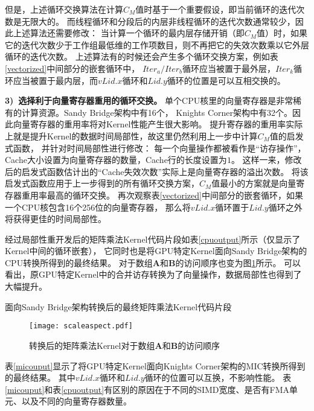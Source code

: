 但是，上述循环交换算法在计算$C_M$值时基于一个重要假设，即当前循环的迭代次数是无限大的。
而线程循环和分段后的内层非线程循环的迭代次数通常较少，因此上述算法还需要修改：
当计算一个循环的最内层存储开销（即$C_M$值）时，如果它的迭代次数少于工作组最低维的工作项数目，则不再把它的失效次数乘以它外层循环的迭代次数。
上述算法有的时候还会产生多个循环交换方案，例如表\ref{vectorized}中间部分的嵌套循环中，
${Iter_a/Iter_b}$循环应当被置于最外层，${Iter_k}$循环应当被置于最内层，而${vLid.x}$循环和${Lid.y}$循环的位置是可以互相交换的。

{\bf 3)\ 选择利于向量寄存器重用的循环交换。} 单个CPU核里的向量寄存器是非常稀有的计算资源。Sandy Bridge架构中有16个，
Knights Corner架构中有32个。因此向量寄存器的重用率将对Kernel性能产生很大影响。
提升寄存器的重用率实际上就是提升Kernel的数据时间局部性，故这里仍然利用上一步中计算$C_M$值的启发式函数，
并针对时间局部性进行修改：
每一个向量操作都被看作是``访存操作''，Cache大小设置为向量寄存器的数量，Cache行的长度设置为$1$。
这样一来，修改后的启发式函数估计出的``Cache失效次数''实际上是向量寄存器的溢出次数。
将该启发式函数应用于上一步得到的所有循环交换方案，$C_M$值最小的方案就是向量寄存器重用率最高的循环交换。
再次观察表\ref{vectorized}中间部分的嵌套循环，如果一个CPU核包含16个256位的向量寄存器，
那么将${vLid.x}$循环置于${Lid.y}$循环之外将获得更佳的时间局部性。

经过局部性重开发后的矩阵乘法Kernel代码片段如表\ref{cpuoutput}所示（仅显示了Kernel中间的循环嵌套），
它同时也是将GPU特定Kernel面向Sandy Bridge架构的CPU转换所得到的最终结果。
对于数组$\bm{A}$和$\bm{B}$的访问顺序也变为图\ref{access2}所示。
可以看出，原GPU特定Kernel中的合并访存转换为了向量操作，数据局部性也得到了大幅提升。

\begin{table}[htb]
	\centering
	\caption{面向Sandy Bridge架构转换后的最终矩阵乘法Kernel代码片段}
	\label{cpuoutput}
\end{table}

\begin{figure}[htb]
\centering
\texttt{[image: scaleaspect.pdf]}
\caption{转换后的矩阵乘法Kernel对于数组$\bm{A}$和$\bm{B}$的访问顺序}
\label{access2}
\end{figure}

表\ref{micouput}显示了将GPU特定Kernel面向Knights Corner架构的MIC转换所得到的最终结果。
其中${vLid.x}$循环和${Lid.y}$循环的位置可以互换，不影响性能。
表\ref{micouput}和表\ref{cpuoutput}有区别的原因在于不同的SIMD宽度、是否有FMA单元、以及不同的向量寄存器数量。


